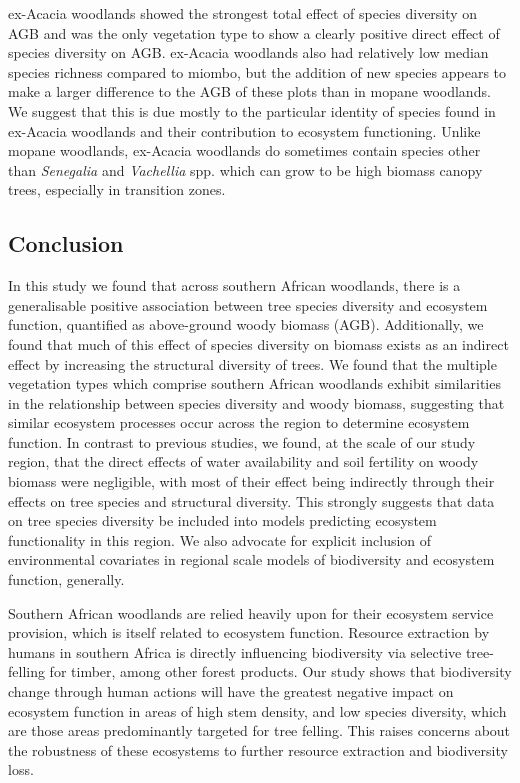 \documentclass[11pt,a4paper]{article}
\begin{document}
ex-Acacia woodlands showed the strongest total effect of species diversity on AGB and was the only vegetation type to show a clearly positive direct effect of species diversity on AGB. ex-Acacia woodlands also had relatively low median species richness compared to miombo, but the addition of new species appears to make a larger difference to the AGB of these plots than in mopane woodlands. We suggest that this is due mostly to the particular identity of species found in ex-Acacia woodlands and their contribution to ecosystem functioning. Unlike mopane woodlands, ex-Acacia woodlands do sometimes contain species other than \textit{Senegalia} and \textit{Vachellia} spp. which can grow to be high biomass canopy trees, especially in transition zones. 

\subsection{Conclusion}

In this study we found that across southern African woodlands, there is a generalisable positive association between tree species diversity and ecosystem function, quantified as above-ground woody biomass (AGB). Additionally, we found that much of this effect of species diversity on biomass exists as an indirect effect by increasing the structural diversity of trees. We found that the multiple vegetation types which comprise southern African woodlands exhibit similarities in the relationship between species diversity and woody biomass, suggesting that similar ecosystem processes occur across the region to determine ecosystem function. In contrast to previous studies, we found, at the scale of our study region, that the direct effects of water availability and soil fertility on woody biomass were negligible, with most of their effect being indirectly through their effects on tree species and structural diversity. This strongly suggests that data on tree species diversity be included into models predicting ecosystem functionality in this region. We also advocate for explicit inclusion of environmental covariates in regional scale models of biodiversity and ecosystem function, generally.

Southern African woodlands are relied heavily upon for their ecosystem service provision, which is itself related to ecosystem function. Resource extraction by humans in southern Africa is directly influencing biodiversity via selective tree-felling for timber, among other forest products. Our study shows that biodiversity change through human actions will have the greatest negative impact on ecosystem function in areas of high stem density, and low species diversity, which are those areas predominantly targeted for tree felling. This raises concerns about the robustness of these ecosystems to further resource extraction and biodiversity loss. 
\end{document}

